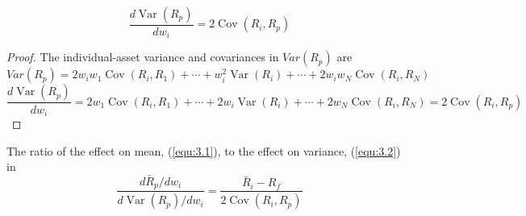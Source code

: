 \documentclass[11pt,green,twocol,citestyle=authoryear, bibstyle=authoryear]{elegantbook}
\begin{document}
\begin{equation}\label{equ:3.2}
    \frac{d \operatorname{Var}\left(R_p\right)}{d w_i}=2 \operatorname{Cov}\left(R_i, R_p\right)
\end{equation} 

\begin{proof}
    The individual-asset variance and covariances in $ Var(R_p) $ are
\begin{equation*}
    Var(R_p)= 2 w_i w_1 \operatorname{Cov}\left(R_i, R_1\right)+\cdots+w_i^2 \operatorname{Var}\left(R_i\right)+\cdots+2 w_i w_N \operatorname{Cov}\left(R_i, R_N\right) 
\end{equation*} 
\begin{equation}\label{equ:3.3}
       \frac{d \operatorname{Var}\left(R_p\right)}{d w_i} = 2 w_1 \operatorname{Cov}\left(R_i, R_1\right)+\cdots+2 w_i \operatorname{Var}\left(R_i\right) +\cdots+2 w_N \operatorname{Cov}\left(R_i, R_N\right)=2 \operatorname{Cov}\left(R_i, R_p\right)
\end{equation}
\end{proof}

The ratio of the effect on mean, (\ref{equ:3.1}), to the effect on variance, (\ref{equ:3.2}) in
\begin{equation}\label{equ:3.4}
    \frac{d \bar{R}_p / d w_i}{d \operatorname{Var}\left(R_p\right) / d w_i}=\frac{\bar{R}_i-R_f}{2 \operatorname{Cov}\left(R_i, R_p\right)}
\end{equation}
\end{document}
